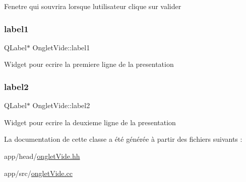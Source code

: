 Fenetre qui s\textquotesingle{}ouvrira lorsque l\textquotesingle{}utilisateur clique sur valider \mbox{\label{classOngletVide_a7e085f321d5ad309660e3d23ebb5664e}} 
\subsubsection{\texorpdfstring{label1}{label1}}
{\footnotesize\ttfamily Q\+Label$\ast$ Onglet\+Vide\+::label1\hspace{0.3cm}{\ttfamily [private]}}

Widget pour ecrire la premiere ligne de la presentation \mbox{\label{classOngletVide_af334ad6ead863ce00f5f892215d9ceb5}} 
\subsubsection{\texorpdfstring{label2}{label2}}
{\footnotesize\ttfamily Q\+Label$\ast$ Onglet\+Vide\+::label2\hspace{0.3cm}{\ttfamily [private]}}

Widget pour ecrire la deuxieme ligne de la presentation 

La documentation de cette classe a été générée à partir des fichiers suivants \+:\begin{DoxyCompactItemize}
\item 
app/head/\hyperlink{ongletVide_8hh}{onglet\+Vide.\+hh}\item 
app/src/\hyperlink{ongletVide_8cc}{onglet\+Vide.\+cc}\end{DoxyCompactItemize}
